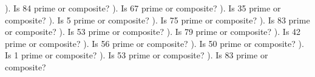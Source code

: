 \documentclass{article}%
\begin{document}
\newline%
). Is 84 prime or composite?%
\newline%
\newline%
). Is 67 prime or composite?%
\newline%
\newline%
). Is 35 prime or composite?%
\newline%
\newline%
). Is 5 prime or composite?%
\newline%
\newline%
). Is 75 prime or composite?%
\newline%
\newline%
). Is 83 prime or composite?%
\newline%
\newline%
). Is 53 prime or composite?%
\newline%
\newline%
). Is 79 prime or composite?%
\newline%
\newline%
). Is 42 prime or composite?%
\newline%
\newline%
). Is 56 prime or composite?%
\newline%
\newline%
). Is 50 prime or composite?%
\newline%
\newline%
). Is 1 prime or composite?%
\newline%
\newline%
). Is 53 prime or composite?%
\newline%
\newline%
). Is 83 prime or composite?%
\newline%
\newline%
\newline%
\end{document}
